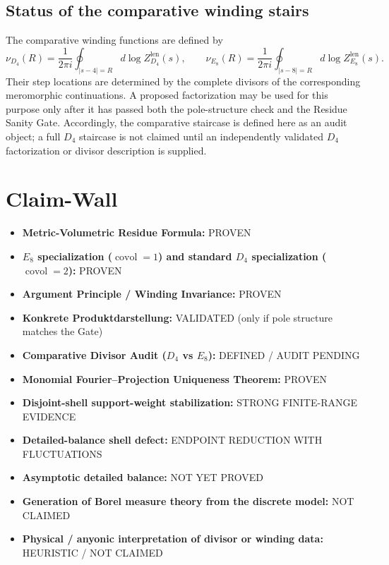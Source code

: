 \documentclass{article}
\begin{document}
\subsection{Status of the comparative winding stairs}

The comparative winding functions are defined by
\[
\nu_{D_4}(R)=\frac{1}{2\pi i}\oint_{|s-4|=R}d\log Z_{D_4}^{\mathrm{len}}(s),
\qquad
\nu_{E_8}(R)=\frac{1}{2\pi i}\oint_{|s-8|=R}d\log Z_{E_8}^{\mathrm{len}}(s).
\]
Their step locations are determined by the complete divisors of the corresponding meromorphic continuations. A proposed factorization may be used for this purpose only after it has passed both the pole-structure check and the Residue Sanity Gate. Accordingly, the comparative staircase is defined here as an audit object; a full $D_4$ staircase is not claimed until an independently validated $D_4$ factorization or divisor description is supplied.

\section{Claim-Wall}

\begin{itemize}
    \item \textbf{Metric-Volumetric Residue Formula:} PROVEN
    \item \textbf{$E_8$ specialization ($\operatorname{covol}=1$) and standard $D_4$ specialization ($\operatorname{covol}=2$):} PROVEN
    \item \textbf{Argument Principle / Winding Invariance:} PROVEN
    \item \textbf{Konkrete Produktdarstellung:} VALIDATED (only if pole structure matches the Gate)
    \item \textbf{Comparative Divisor Audit ($D_4$ vs $E_8$):} DEFINED / AUDIT PENDING
    \item \textbf{Monomial Fourier--Projection Uniqueness Theorem:} PROVEN
    \item \textbf{Disjoint-shell support-weight stabilization:} STRONG FINITE-RANGE EVIDENCE
    \item \textbf{Detailed-balance shell defect:} ENDPOINT REDUCTION WITH FLUCTUATIONS
    \item \textbf{Asymptotic detailed balance:} NOT YET PROVED
    \item \textbf{Generation of Borel measure theory from the discrete model:} NOT CLAIMED
    \item \textbf{Physical / anyonic interpretation of divisor or winding data:} HEURISTIC / NOT CLAIMED
\end{itemize}
\end{document}
